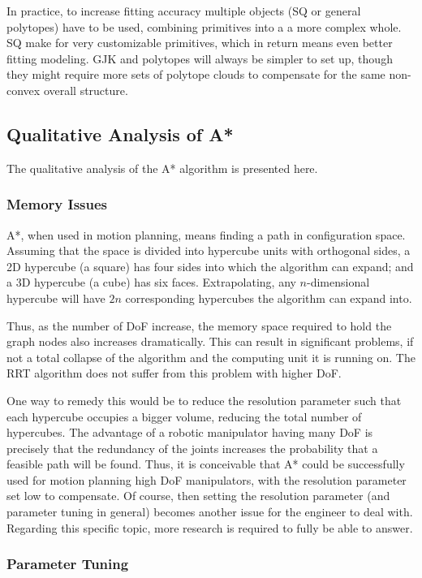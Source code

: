 In practice, to increase fitting accuracy multiple objects (\gls{SQ} or general polytopes) have to be used, combining primitives into a a more complex whole. \gls{SQ} make for very customizable primitives, which in return means even better fitting modeling. \gls{GJK} and polytopes will always be simpler to set up, though they might require more sets of polytope clouds to compensate for the same non-convex overall structure.	


\subsection{Qualitative Analysis of A*}

The qualitative analysis of the A* algorithm is presented here.

\subsubsection{Memory Issues}
A*, when used in motion planning, means finding a path in configuration space. Assuming that the space is divided into hypercube units with orthogonal sides, a 2D hypercube (a square) has four sides into which the algorithm can expand; and a 3D hypercube (a cube) has six faces. Extrapolating, any $n$-dimensional hypercube will have $2n$ corresponding hypercubes the algorithm can expand into.

Thus, as the number of \gls{DoF} increase, the memory space required to hold the graph nodes also increases dramatically. This can result in significant problems, if not a total collapse of the algorithm and the computing unit it is running on. The \gls{RRT} algorithm does not suffer from this problem with higher \gls{DoF}.

One way to remedy this would be to reduce the resolution parameter such that each hypercube occupies a bigger volume, reducing the total number of hypercubes. The advantage of a robotic manipulator having many \gls{DoF} is precisely that the redundancy of the joints increases the probability that a feasible path will be found. Thus, it is conceivable that A* could be successfully used for motion planning high \gls{DoF} manipulators, with the resolution parameter set low to compensate. Of course, then setting the resolution parameter (and parameter tuning in general) becomes another issue for the engineer to deal with. Regarding this specific topic, more research is required to fully be able to answer.

\subsubsection{Parameter Tuning}

